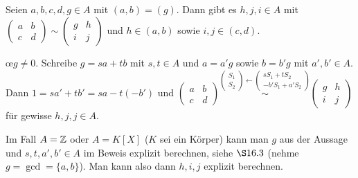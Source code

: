 \documentclass[../../main.tex]{subfiles}
\begin{document}
\begin{lem}\label{17.1.5}
    Seien $a,b,c,d,g\in A$ mit $(a,b)=(g)$. Dann gibt es $h,j,i\in A$ mit $\begin{pmatrix*}a & b \\ c & d\end{pmatrix*}\sim \begin{pmatrix*}g & h \\ i & j\end{pmatrix*}$ und $h\in (a,b)$ sowie $i,j\in (c,d)$.
\end{lem}
\begin{cproof}
    \oe $g\neq 0$. Schreibe $g=sa+tb$ mit $s,t\in A$ und $a=a'g$ sowie $b=b'g$ mit $a',b'\in A$. Dann $1=sa'+tb'=sa-t(-b')$ und $\begin{pmatrix*}a & b \\ c & d\end{pmatrix*}\stackrel{\left(\begin{smallmatrix}S_1\\ S_2\end{smallmatrix}\right)\leftarrow\left(\begin{smallmatrix}sS_1+tS_2\\ -b'S_1+a'S_2\end{smallmatrix}\right)}{\sim}\begin{pmatrix*}g & h \\ i & j\end{pmatrix*}$ für gewisse $h,j,j\in A$.
\end{cproof}

\begin{bem}\label{17.1.6}
    Im Fall $A=\mathbb Z$ oder $A=K[X]$ ($K$ sei ein Körper) kann man $g$ aus der Aussage und $s,t,a',b'\in A$ im Beweis explizit berechnen, siehe $\S16.3$ (nehme $g=\gcd=\{a,b\}$). Man kann also dann $h,i,j$ explizit berechnen.
\end{bem}
\end{document}
